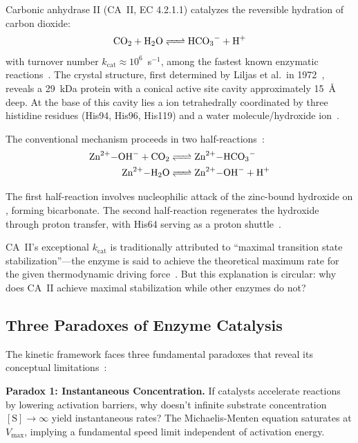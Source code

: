 \documentclass[twocolumn,amsmath,amssymb,aps,prb,superscriptaddress,longbibliography]{revtex4-2}
\newcommand{\kcat}{k_{\mathrm{cat}}}
\newcommand{\Vmax}{V_{\mathrm{max}}}
\begin{document}
Carbonic anhydrase II (CA~II, EC 4.2.1.1) catalyzes the reversible hydration of carbon dioxide:
\begin{equation}
\ce{CO2 + H2O <=> HCO3- + H+}
\label{eq:caii-reaction}
\end{equation}
with turnover number $\kcat \approx 10^6$~s$^{-1}$, among the fastest known enzymatic reactions~\cite{Lindskog1997, Krishnamurthy2008}. The crystal structure, first determined by Liljas et al.\ in 1972~\cite{Liljas1972}, reveals a 29~kDa protein with a conical active site cavity approximately 15~\AA{} deep. At the base of this cavity lies a  ion tetrahedrally coordinated by three histidine residues (His94, His96, His119) and a water molecule/hydroxide ion~\cite{Hakansson1992}.

The conventional mechanism proceeds in two half-reactions~\cite{Silverman1988, Krishnamurthy2008}:
\begin{align}
\ce{Zn^{2+}-OH- + CO2 &<=> Zn^{2+}-HCO3-} \label{eq:half1} \\
\ce{Zn^{2+}-H2O &<=> Zn^{2+}-OH- + H+} \label{eq:half2}
\end{align}

The first half-reaction involves nucleophilic attack of the zinc-bound hydroxide on , forming bicarbonate. The second half-reaction regenerates the hydroxide through proton transfer, with His64 serving as a proton shuttle~\cite{Tu1989, Maupin2009, Mikulski2010}.

CA~II's exceptional $\kcat$ is traditionally attributed to ``maximal transition state stabilization''---the enzyme is said to achieve the theoretical maximum rate for the given thermodynamic driving force~\cite{Silverman1988}. But this explanation is circular: why does CA~II achieve maximal stabilization while other enzymes do not?

\subsection{Three Paradoxes of Enzyme Catalysis}

The kinetic framework faces three fundamental paradoxes that reveal its conceptual limitations~\cite{Sachikonye2025}:

\textbf{Paradox 1: Instantaneous Concentration.} If catalysts accelerate reactions by lowering activation barriers, why doesn't infinite substrate concentration $[\text{S}] \to \infty$ yield instantaneous rates? The Michaelis-Menten equation saturates at $\Vmax$, implying a fundamental speed limit independent of activation energy.
\end{document}
